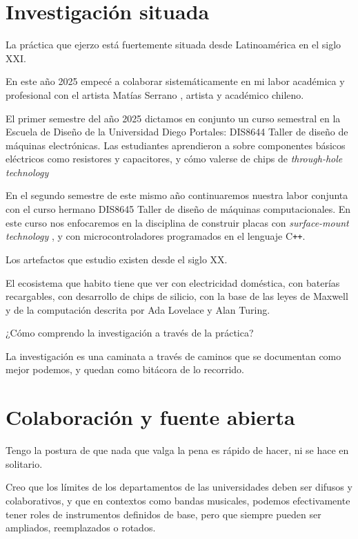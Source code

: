 \documentclass{article}
\begin{document}
\clearpage

\section{Investigación situada}

La práctica que ejerzo está fuertemente situada desde Latinoamérica en el siglo XXI.

En este año 2025 empecé a colaborar sistemáticamente en mi labor académica y profesional con el artista Matías Serrano \cite{misaa}, artista y académico chileno.

El primer semestre del año 2025 dictamos en conjunto un curso semestral en la Escuela de Diseño de la Universidad Diego Portales: DIS8644 Taller de diseño de máquinas electrónicas. Las estudiantes aprendieron a sobre componentes básicos eléctricos como resistores y capacitores, y cómo valerse de chips de \textit{through-hole technology} \cite{tht}

En el segundo semestre de este mismo año continuaremos nuestra labor conjunta con el curso hermano DIS8645 Taller de diseño de máquinas computacionales. En este curso nos enfocaremos en la disciplina de construir placas con \textit{surface-mount technology} \cite{smt}, y con microcontroladores programados en el lenguaje C\texttt{++}.

Los artefactos que estudio existen desde el siglo XX.

El ecosistema que habito tiene que ver con electricidad doméstica, con baterías recargables, con desarrollo de chips de silicio, con la base de las leyes de Maxwell y de la computación descrita por Ada Lovelace y Alan Turing.

¿Cómo comprendo la investigación a través de la práctica?

La investigación es una caminata a través de caminos que se documentan como mejor podemos, y quedan como bitácora de lo recorrido.

\clearpage

\section{Colaboración y fuente abierta}

Tengo la postura de que nada que valga la pena es rápido de hacer, ni se hace en solitario.

Creo que los límites de los departamentos de las universidades deben ser difusos y colaborativos, y que en contextos como bandas musicales, podemos efectivamente tener roles de instrumentos definidos de base, pero que siempre pueden ser ampliados, reemplazados o rotados.
\end{document}
